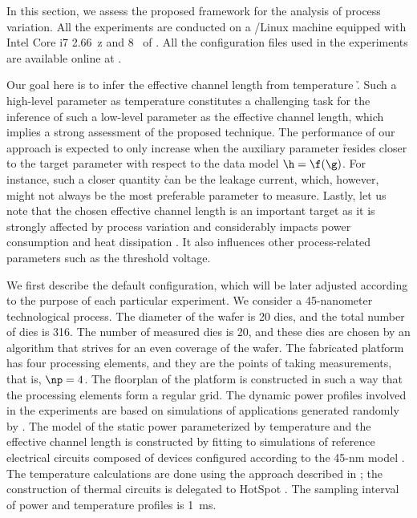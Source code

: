 In this section, we assess the proposed framework for the analysis of process
variation. All the experiments are conducted on a /Linux machine
equipped with Intel Core i7 2.66~z and 8~ of . All the
configuration files used in the experiments are available online at
\cite{eslab2014a}.

Our goal here is to infer the effective channel length \g from temperature \h.
Such a high-level parameter as temperature constitutes a challenging task for
the inference of such a low-level parameter as the effective channel length,
which implies a strong assessment of the proposed technique. The performance of
our approach is expected to only increase when the auxiliary parameter \h
resides closer to the target parameter \g with respect to the data model $\h =
\f(\g)$. For instance, such a closer quantity \h can be the leakage current,
which, however, might not always be the most preferable parameter to measure.
Lastly, let us note that the chosen effective channel length is an important
target as it is strongly affected by process variation and considerably impacts
power consumption and heat dissipation \cite{chandrakasan2000, srivastava2010,
juan2011, juan2012}. It also influences other process-related parameters such as
the threshold voltage.

We first describe the default configuration, which will be later adjusted
according to the purpose of each particular experiment. We consider a
45-nanometer technological process. The diameter of the wafer is 20 dies, and
the total number of dies \nd is 316. The number of measured dies \hnd is 20, and
these dies are chosen by an algorithm that strives for an even coverage of the
wafer. The fabricated platform has four processing elements, and they are the
points of taking measurements, that is, $\np = 4$. The floorplan of the platform
is constructed in such a way that the processing elements form a regular grid.
The dynamic power profiles involved in the experiments are based on simulations
of applications generated randomly by  \cite{dick1998}. The model of
the static power parameterized by temperature and the effective channel length
is constructed by fitting to  simulations of reference electrical
circuits composed of  devices \cite{bsim} configured according to the
45-nm   model \cite{ptm}. The temperature calculations are done
using the approach described in ; the
construction of thermal  circuits is delegated to HotSpot
\cite{skadron2003}. The sampling interval of power and temperature profiles is
1~ms.

